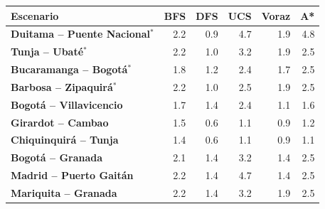 \renewcommand{\arraystretch}{1.2}
\begin{tabular}{|l|r|r|r|r|r|}
\hline
\rowcolor{gray!20} \textbf{Escenario} & \textbf{BFS} & \textbf{DFS} & \textbf{UCS} & \textbf{Voraz} & \textbf{A*} \\
\hline
\textbf{Duitama -- Puente Nacional$^{*}$} & 2.2 & 0.9 & 4.7 & 1.9 & 4.8 \\
\hline
\textbf{Tunja -- Ubaté$^{*}$} & 2.2 & 1.0 & 3.2 & 1.9 & 2.5 \\
\hline
\textbf{Bucaramanga -- Bogotá$^{*}$} & 1.8 & 1.2 & 2.4 & 1.7 & 2.5 \\
\hline
\textbf{Barbosa -- Zipaquirá$^{*}$} & 2.2 & 1.0 & 2.5 & 1.9 & 2.5 \\
\hline
\textbf{Bogotá -- Villavicencio} & 1.7 & 1.4 & 2.4 & 1.1 & 1.6 \\
\hline
\textbf{Girardot -- Cambao} & 1.5 & 0.6 & 1.1 & 0.9 & 1.2 \\
\hline
\textbf{Chiquinquirá -- Tunja} & 1.4 & 0.6 & 1.1 & 0.9 & 1.1 \\
\hline
\textbf{Bogotá -- Granada} & 2.1 & 1.4 & 3.2 & 1.4 & 2.5 \\
\hline
\textbf{Madrid -- Puerto Gaitán} & 2.2 & 1.4 & 4.7 & 1.4 & 2.5 \\
\hline
\textbf{Mariquita -- Granada} & 2.2 & 1.4 & 3.2 & 1.9 & 2.5 \\
\hline
\end{tabular}
